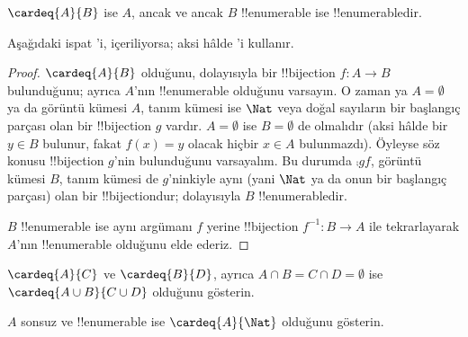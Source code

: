 \begin{prop}
$\cardeq{A}{B}$ ise $A$, ancak ve ancak $B$ !!{enumerable} ise
!!{enumerable}{}dir.
\end{prop}

\begin{editorial}
  Aşağıdaki ispat 'i, 
  içeriliyorsa; aksi hâlde 'i kullanır.
\end{editorial}

\begin{proof}
$\cardeq{A}{B}$ olduğunu, dolayısıyla bir !!{bijection} $f\colon A\to B$
bulunduğunu; ayrıca $A$'nın !!{enumerable} olduğunu varsayın.
{
  O zaman ya $A=\emptyset$ ya da görüntü kümesi $A$, tanım kümesi ise
  $\Nat$ veya doğal sayıların bir başlangıç parçası olan bir !!{bijection}
  $g$ vardır. $A=\emptyset$ ise $B=\emptyset$ de olmalıdır (aksi hâlde bir
  $y\in B$ bulunur, fakat $f(x)=y$ olacak hiçbir $x\in A$ bulunmazdı).
  Öyleyse söz konusu !!{bijection} $g$'nin bulunduğunu varsayalım. Bu durumda
  $\comp{g}{f}$, görüntü kümesi $B$, tanım kümesi de $g$'ninkiyle aynı (yani
  $\Nat$ ya da onun bir başlangıç parçası) olan bir !!{bijection}{}dur;
  dolayısıyla $B$ !!{enumerable}{}dir.}

$B$ !!{enumerable} ise aynı argümanı $f$ yerine !!{bijection}
$f^{-1}\colon B\to A$ ile tekrarlayarak $A$'nın !!{enumerable} olduğunu
elde ederiz.
\end{proof}

\begin{prob}
$\cardeq{A}{C}$ ve $\cardeq{B}{D}$, ayrıca $A\cap B=C\cap D=\emptyset$ ise
$\cardeq{A\cup B}{C\cup D}$ olduğunu gösterin.
\end{prob}

\begin{prob}
$A$ sonsuz ve !!{enumerable} ise $\cardeq{A}{\Nat}$ olduğunu gösterin.
\end{prob}

